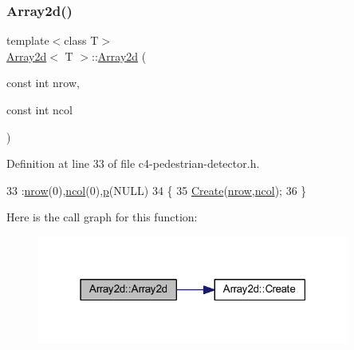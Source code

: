 \subsubsection{\texorpdfstring{Array2d()}{Array2d()}\hspace{0.1cm}{\footnotesize\ttfamily [2/3]}}
{\footnotesize\ttfamily template$<$class T$>$ \\
\mbox{\hyperlink{class_array2d}{Array2d}}$<$ T $>$\+::\mbox{\hyperlink{class_array2d}{Array2d}} (\begin{DoxyParamCaption}\item[{const int}]{nrow,  }\item[{const int}]{ncol }\end{DoxyParamCaption})\hspace{0.3cm}{\ttfamily [inline]}}



Definition at line 33 of file c4-\/pedestrian-\/detector.\+h.


\begin{DoxyCode}
33                                           :\mbox{\hyperlink{class_array2d_a373dd63664bee40ef720d183d03e5bdb}{nrow}}(0),\mbox{\hyperlink{class_array2d_afe48cd05774cae5b6872324ae49e089b}{ncol}}(0),\mbox{\hyperlink{class_array2d_ac7b70bc423364c43c7c174cdde515380}{p}}(NULL)
34     \{
35         \mbox{\hyperlink{class_array2d_af1d2cec0973cedfe74ae5b967532922f}{Create}}(\mbox{\hyperlink{class_array2d_a373dd63664bee40ef720d183d03e5bdb}{nrow}},\mbox{\hyperlink{class_array2d_afe48cd05774cae5b6872324ae49e089b}{ncol}});
36     \}
\end{DoxyCode}
Here is the call graph for this function\+:\nopagebreak
\begin{figure}[H]
\begin{center}
\leavevmode
\includegraphics[width=291pt]{class_array2d_ac7c55fd62aeda8ffb83e6c4ae39a2488_cgraph}
\end{center}
\end{figure}
\mbox{\label{class_array2d_ad3b3759e78a6840cce7b8009fe960621}} 
